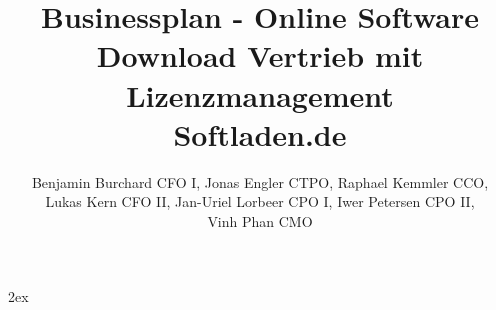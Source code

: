 \documentclass[draft=false
              ,paper=a4
              ,twoside=false
              ,fontsize=11pt
              ,headsepline
              ,BCOR10mm
              ,DIV11
              ]{scrbook}
\begin{document}
\parindent0mm
\parskip2ex

\frontmatter
\title{Businessplan - Online Software Download Vertrieb mit Lizenzmanagement\\Softladen.de}
\author{Benjamin Burchard CFO I, Jonas Engler CTPO, Raphael Kemmler CCO, \\Lukas Kern CFO II, Jan-Uriel Lorbeer CPO I, Iwer Petersen CPO II, \\Vinh Phan CMO}
\maketitle

\newpage

\mainmatter
\onehalfspacing











%
%
\end{document}
